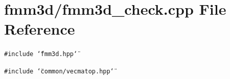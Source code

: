 \section{fmm3d/fmm3d\_\-check.cpp File Reference}
\label{fmm3d__check_8cpp}


{\tt \#include \char`\"{}fmm3d.hpp\char`\"{}}\par
{\tt \#include \char`\"{}common/vecmatop.hpp\char`\"{}}\par
